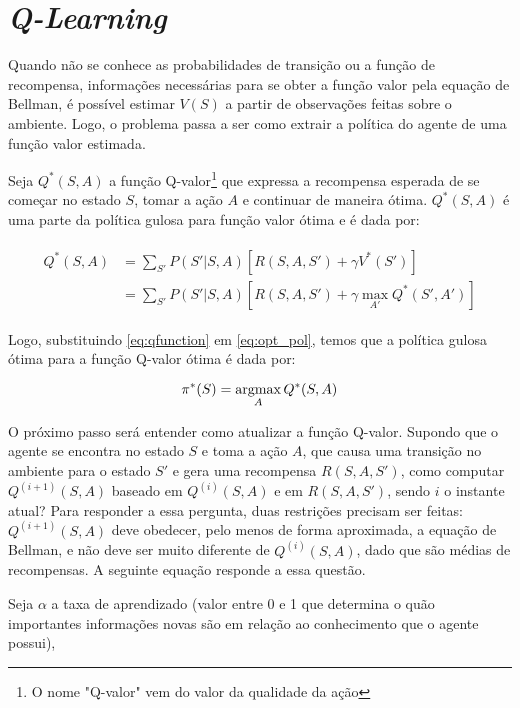 
\section{\textit{Q-Learning}}
\label{sec:ql}

Quando não se conhece as probabilidades de transição ou a função de recompensa, informações necessárias para se obter a função valor pela equação de Bellman, é possível estimar $V(S)$ a partir de observações feitas sobre o ambiente.
Logo, o problema passa a ser como extrair a política do agente de uma função valor estimada.

Seja $Q^{*}(S,A)$ a função Q-valor\footnote{O nome "Q-valor"{} vem do valor da qualidade da ação} que expressa a recompensa esperada de se começar no estado $S$, tomar a ação $A$ e continuar de maneira ótima. $Q^{*}(S,A)$ é uma parte da política gulosa para função valor ótima e é dada por:

\begin{align}
\begin{split}
Q^{*}(S,A) &= \sum_{S'}P(S'|S,A)[R(S,A,S') + \gamma V^{*}(S')] \\
        &= \sum_{S'}P(S'|S,A)[R(S,A,S') + \gamma \max_{A'}Q^{*}(S',A')]
\end{split}
\label{eq:qfunction}
\end{align}

Logo, substituindo \ref{eq:qfunction} em \ref{eq:opt_pol}, temos que a política gulosa ótima para a função Q-valor ótima é dada por:

\begin{equation} \label{eq:q_opt_pol}
\pi^{*}(S) = \operatorname*{argmax}_{A}Q^{*}(S,A)
\end{equation}

O próximo passo será entender como atualizar a função Q-valor.
Supondo que o agente se encontra no estado $S$ e toma a ação $A$, que causa uma transição no ambiente para o estado $S'$ e gera uma recompensa $R(S,A,S')$, como computar $Q^{(i+1)}(S,A)$ baseado em $Q^{(i)}(S,A)$ e em $R(S,A,S')$, sendo $i$ o instante atual?
Para responder a essa pergunta, duas restrições precisam ser feitas: $Q^{(i+1)}(S,A)$ deve obedecer, pelo menos de forma aproximada, a equação de Bellman, e não deve ser muito diferente de $Q^{(i)}(S,A)$, dado que são médias de recompensas.
A seguinte equação responde a essa questão.

Seja $\alpha$ a taxa de aprendizado (valor entre 0 e 1 que determina o quão importantes informações novas são em relação ao conhecimento que o agente possui),

